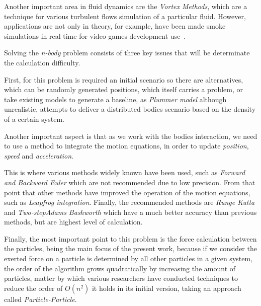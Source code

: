 Another important area in fluid dynamics are the \emph{Vortex Methods},
which are a technique for various turbulent flows simulation of a particular fluid.
However, applications are not only in theory, for example,
have been made smoke simulations in real time for video games development use~\cite{Gourlay}.


Solving the \emph{n-body} problem consists of three
key issues that will be determinate the calculation difficulty.

First, for this problem is required an initial scenario
so there are alternatives, which can be
randomly generated positions, which itself carries a problem,
or take existing models to generate a baseline,
as \emph{Plummer model} although unrealistic,
attempts to deliver a distributed bodies scenario
based on the density of a certain system.

Another important aspect is that as we work with the bodies interaction,
we need to use a method to integrate the motion equations,
in order to update \emph{position}, \emph{speed}
and \emph{acceleration}.

This is where various methods widely known have been used,
such as \emph{Forward and Backward Euler} which are not recommended
due to low precision. From that point that other methods have improved
the operation of the motion equations, such as \emph{Leapfrog integration}.
Finally, the recommended methods are \emph{Runge Kutta} and \emph{Two-stepAdams Bashworth}
which have a much better accuracy than previous methods, but are
highest level of calculation.

Finally, the most important point to this problem is the force calculation between the particles,
being the main focus of the present work, because if we consider the exerted force on a particle
is determined by all other particles in a given system, the order of the algorithm grows
quadratically by increasing the amount of particles, matter by which various researchers have
conducted techniques to reduce the order of $O(n^2)$ it holds in its initial version,
taking an approach called \emph{Particle-Particle}.







